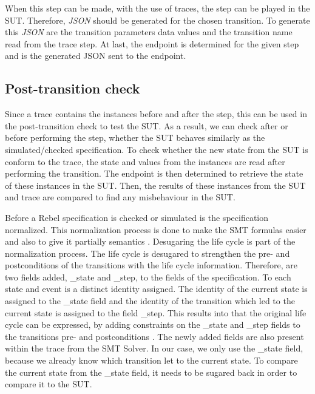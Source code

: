 When this step can be made, with the use of traces, the step can be played in
the SUT. Therefore, \textit{JSON} should be generated for the chosen transition.
To generate this \textit{JSON} are the transition parameters data values and
the transition name read from the trace step. At last, the endpoint is
determined for the given step and is the generated JSON sent to the endpoint.

\subsection{Post-transition check}

Since a trace contains the instances before and after the step, this can be used
in the post-transition check to test the SUT. As a result, we can check after or
before performing the step, whether the SUT behaves similarly as the
simulated/checked specification. To check whether the new state from the SUT is
conform to the trace, the state and values from the instances are read after
performing the transition. The endpoint is then determined to retrieve the state
of these instances in the SUT. Then, the results of these instances from the SUT
and trace are compared to find any misbehaviour in the SUT.

Before a Rebel specification is checked or simulated is the specification
normalized. This normalization process is done to make the SMT formulas easier
and also to give it partially semantics
\cite[p.5]{stoel_storm_vinju_bosman_2016}. Desugaring the life cycle is part of
the normalization process. The life cycle is desugared to strengthen the pre-
and postconditions of the transitions with the life cycle information.
Therefore, are two fields added, \_state and \_step, to the fields of the
specification. To each state and event is a distinct identity assigned. The
identity of the current state is assigned to the \_state field and the identity
of the transition which led to the current state is assigned to the field
\_step. This results into that the original life cycle can be expressed, by
adding constraints on the \_state and \_step fields to the transitions pre- and
postconditions \cite[p.5]{stoel_storm_vinju_bosman_2016}. The newly added fields
are also present within the trace from the SMT Solver. In our case, we only use
the \_state field, because we already know which transition let to the current
state. To compare the current state from the \_state field, it needs to be
sugared back in order to compare it to the SUT.

